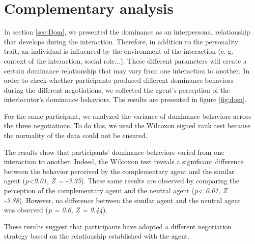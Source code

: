 \documentclass[10pt, a4paper, twocolumn]{article} %
\begin{document}
	\section{Complementary analysis}
	In section \ref{sec:Dom}, we presented the dominance as an interpersonal relationship that develops during the interaction. 
	Therefore, in addition to the personality trait, an individual is influenced by the environment of the interaction (e. g. context of the interaction, social role...). These different parameters will create a certain dominance relationship that may vary from one interaction to another.  
	In order to check whether participants produced different dominance behaviors during the different negotiations, we collected the agent's perception of the interlocutor's dominance behaviors.  The results are presented in figure \ref{fig:dom}.
	
	For the same participant, we analyzed the variance of dominance behaviors across the three negotiations. To do this, we used the Wilcoxon signed rank test because the normality of the data could not be ensured. 
	
	The results show that participants' dominance behaviors varied from one interaction to another. Indeed, the Wilcoxon test reveals a significant difference between the behavior perceived by the complementary agent and the similar agent (\emph{p<0.01, Z = -3.35}). These same results are observed by comparing the perception of the complementary agent and the neutral agent (\emph{p< 0.01, Z = -3.88}).
	However, no difference between the similar agent and the neutral agent was observed (\emph{p = 0.6, Z = 0.44}). 
	
	These results suggest that participants have adopted a different negotiation strategy based on the relationship established with the agent.
%		
%		
%		
\end{document}
